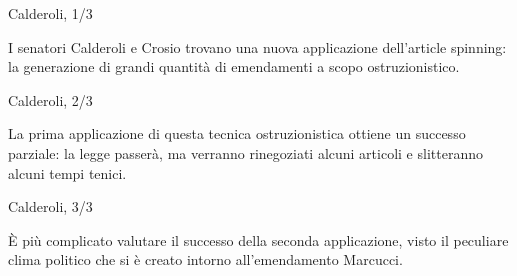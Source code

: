 \documentclass[12pt]{beamer}
\begin{document}
  \begin{frame}{Calderoli, 1/3}
    \begin{figure}
      \centering
    \end{figure}

    I senatori Calderoli e Crosio trovano una nuova applicazione dell'article
    spinning: la generazione di grandi quantità di emendamenti a scopo
    ostruzionistico.
  \end{frame}

  \begin{frame}{Calderoli, 2/3}
    \begin{figure}
      \centering
    \end{figure}

    La prima applicazione di questa tecnica ostruzionistica ottiene un successo
    parziale: la legge passerà, ma verranno rinegoziati alcuni articoli e
    slitteranno alcuni tempi tenici.
  \end{frame}

  \begin{frame}{Calderoli, 3/3}
    \begin{figure}
      \centering
    \end{figure}

    È più complicato valutare il successo della seconda applicazione, visto il
    peculiare clima politico che si è creato intorno all'emendamento Marcucci.
  \end{frame}
\end{document}
